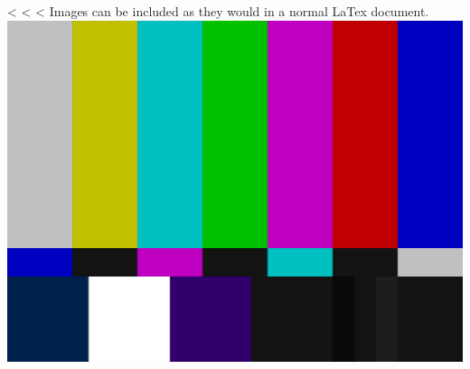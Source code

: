 \documentclass[12pt]{exam}
\begin{document}
\begin{questions}
                <%
                <%
                <%
                Images can be included as they would in a normal LaTex document.
                \includegraphics[width= \linewidth]{test.png}
        \end{questions}
    
\end{document}
